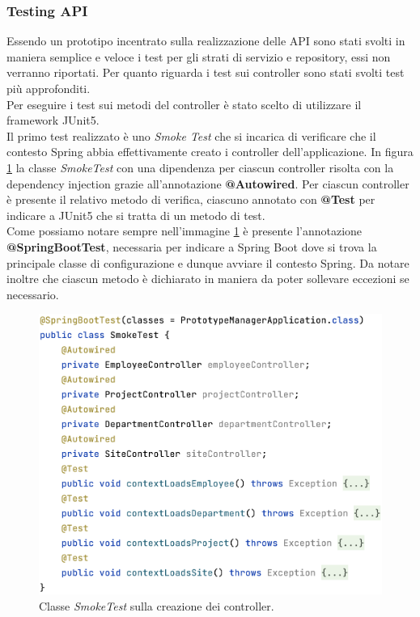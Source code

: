 \subsubsection*{Testing API}
Essendo un prototipo incentrato sulla realizzazione delle API sono stati svolti in maniera semplice e veloce i test per gli strati di servizio e repository, essi non verranno riportati. Per quanto riguarda i test sui controller sono stati svolti test più approfonditi.\\
Per eseguire i test sui metodi del controller è stato scelto di utilizzare il framework JUnit5.\\
Il primo test realizzato è uno \textit{Smoke Test} che si incarica di verificare che il contesto Spring abbia effettivamente creato i controller dell'applicazione. In figura \ref{smoke-test} la classe \textit{SmokeTest} con una dipendenza per ciascun controller risolta con la dependency injection grazie all'annotazione \textbf{@Autowired}. Per ciascun controller è presente il relativo metodo di verifica, ciascuno annotato con \textbf{@Test} per indicare a JUnit5 che si tratta di un metodo di test.\\
Come possiamo notare sempre nell'immagine \ref{smoke-test} è presente l'annotazione \textbf{@SpringBootTest}, necessaria per indicare a Spring Boot dove si trova la principale classe di configurazione e dunque avviare il contesto Spring. Da notare inoltre che ciascun metodo è dichiarato in maniera da poter sollevare eccezioni se necessario.
\FloatBarrier
\begin{figure}[!ht]
\begin{mdframed}
\centering
\includegraphics[width=0.7\linewidth]{immagini/SmokeTest.png}
\end{mdframed}
\caption{Classe \textit{SmokeTest} sulla creazione dei controller.}
\label{smoke-test}
\end{figure}
